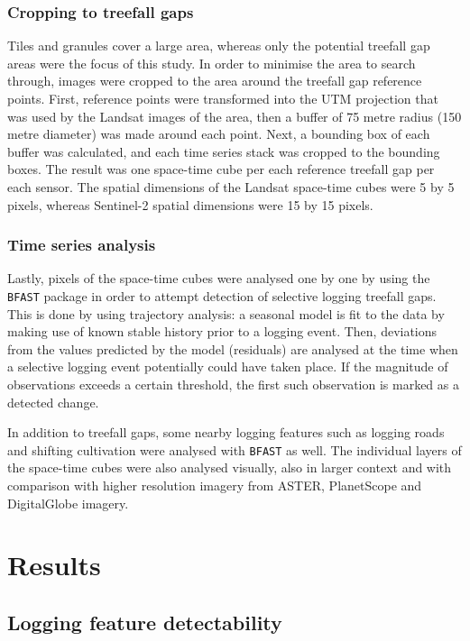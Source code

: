 \documentclass[a4paper,12pt]{scrbook}
\begin{document}
\subsection{Cropping to treefall gaps}

Tiles and granules cover a large area, whereas only the potential treefall gap areas were the focus of this study. In order to minimise the area to search through, images were cropped to the area around the treefall gap reference points. First, reference points were transformed into the \ac{UTM} projection that was used by the Landsat images of the area, then a buffer of 75 metre radius (150 metre diameter) was made around each point. Next, a bounding box of each buffer was calculated, and each time series stack was cropped to the bounding boxes. The result was one space-time cube per each reference treefall gap per each sensor. The spatial dimensions of the Landsat space-time cubes were 5 by 5 pixels, whereas Sentinel-2 spatial dimensions were 15 by 15 pixels.

\subsection{Time series analysis}

Lastly, pixels of the space-time cubes were analysed one by one by using the \texttt{BFAST} package \citep{verbesselt_detecting_2010} in order to attempt detection of selective logging treefall gaps. This is done by using trajectory analysis: a seasonal model is fit to the data by making use of known stable history prior to a logging event. Then, deviations from the values predicted by the model (residuals) are analysed at the time when a selective logging event potentially could have taken place. If the magnitude of observations exceeds a certain threshold, the first such observation is marked as a detected change.

In addition to treefall gaps, some nearby logging features such as logging roads and shifting cultivation were analysed with \texttt{BFAST} as well. The individual layers of the space-time cubes were also analysed visually, also in larger context and with comparison with higher resolution imagery from \ac{ASTER}, PlanetScope and DigitalGlobe imagery.

\chapter{Results}

\section{Logging feature detectability}
\end{document}
